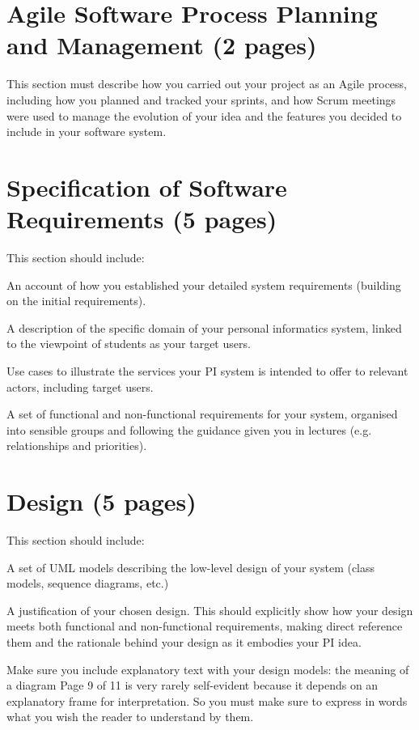 \documentclass[12pt]{article}
\begin{document}
\section{Agile Software Process Planning and Management (2 pages)}

This section must describe how you carried out your project as an Agile process, including
how you planned and tracked your sprints, and how Scrum meetings were used to manage
the evolution of your idea and the features you decided to include in your software system.


\section{Specification of Software Requirements (5 pages)}

This section should include:

An account of how you established your detailed system requirements (building on
the initial requirements).

A description of the specific domain of your personal informatics system, linked to
the viewpoint of students as your target users.

Use cases to illustrate the services your PI system is intended to offer to relevant
actors, including target users.

A set of functional and non-functional requirements for your system, organised into
sensible groups and following the guidance given you in lectures (e.g. relationships
and priorities).


\section{Design (5 pages)}

This section should include:

A set of UML models describing the low-level design of your system (class models,
sequence diagrams, etc.)

A justification of your chosen design. This should explicitly show how your design
meets both functional and non-functional requirements, making direct reference
them and the rationale behind your design as it embodies your PI idea.

Make sure you include explanatory text with your design models: the meaning of a diagram
Page 9 of 11
is very rarely self-evident because it depends on an explanatory frame for interpretation. So
you must make sure to express in words what you wish the reader to understand by them.
\end{document}

